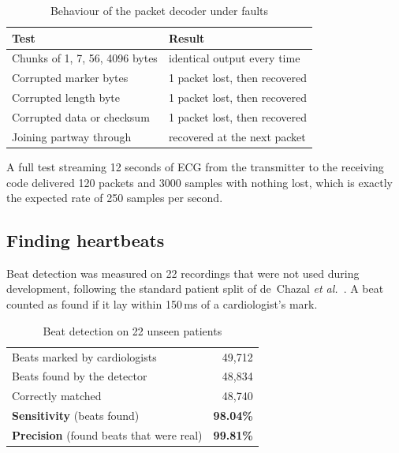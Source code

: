 \documentclass[conference]{IEEEtran}
\begin{document}
\begin{table}[!t]
\caption{Behaviour of the packet decoder under faults}
\label{tab:link}
\centering
\footnotesize
\begin{tabular}{@{}ll@{}}
\toprule
\textbf{Test} & \textbf{Result} \\
\midrule
Chunks of 1, 7, 56, 4096 bytes & identical output every time \\
Corrupted marker bytes         & 1 packet lost, then recovered \\
Corrupted length byte          & 1 packet lost, then recovered \\
Corrupted data or checksum     & 1 packet lost, then recovered \\
Joining partway through        & recovered at the next packet \\
\bottomrule
\end{tabular}
\end{table}

A full test streaming 12 seconds of ECG from the transmitter to the receiving
code delivered 120 packets and 3000 samples with nothing lost, which is exactly
the expected rate of 250 samples per second.

\subsection{Finding heartbeats}

Beat detection was measured on 22 recordings that were not used during
development, following the standard patient split of de~Chazal
\emph{et al.}~\cite{dechazal2004}. A beat counted as found if it lay within
150\,ms of a cardiologist's mark.

\begin{table}[!t]
\caption{Beat detection on 22 unseen patients}
\label{tab:detection}
\centering
\footnotesize
\begin{tabular}{@{}lr@{}}
\toprule
Beats marked by cardiologists & 49{,}712 \\
Beats found by the detector   & 48{,}834 \\
Correctly matched             & 48{,}740 \\
\midrule
\textbf{Sensitivity} (beats found)              & \textbf{98.04\%} \\
\textbf{Precision} (found beats that were real) & \textbf{99.81\%} \\
\bottomrule
\end{tabular}
\end{table}
\end{document}
